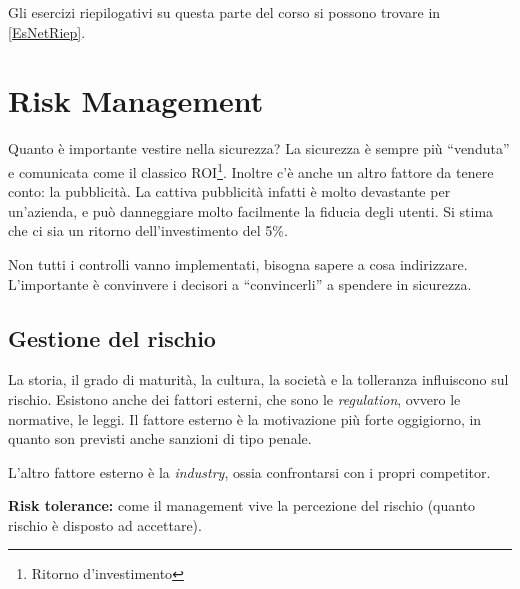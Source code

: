 Gli esercizi riepilogativi su questa parte del corso si possono trovare in
\ref{EsNetRiep}.


\part{Risk Management}

\label{riskMng}

Quanto è importante vestire nella sicurezza? La sicurezza è sempre più
``venduta'' e comunicata come il classico ROI\footnote{Ritorno d'investimento}.
Inoltre c'è anche un altro fattore da tenere conto: la pubblicità. La cattiva
pubblicità infatti è molto devastante per un'azienda, e può danneggiare molto
facilmente la fiducia degli utenti. Si stima che ci sia un ritorno
dell'investimento del 5\%.

Non tutti i controlli vanno implementati, bisogna sapere a cosa indirizzare.
L'importante è convinvere i decisori a ``convincerli'' a spendere in sicurezza.



\chapter{Gestione del rischio}

La storia, il grado di maturità, la cultura, la società e la tolleranza
influiscono sul rischio. Esistono anche dei fattori esterni, che sono le
\textit{regulation}, ovvero le normative, le leggi. Il fattore esterno è la
motivazione più forte oggigiorno, in quanto son previsti anche sanzioni di tipo
penale.

L'altro fattore esterno è la \textit{industry}, ossia confrontarsi con i propri
competitor.

\textbf{Risk tolerance:} come il management vive la percezione del rischio
(quanto rischio è disposto ad accettare).

